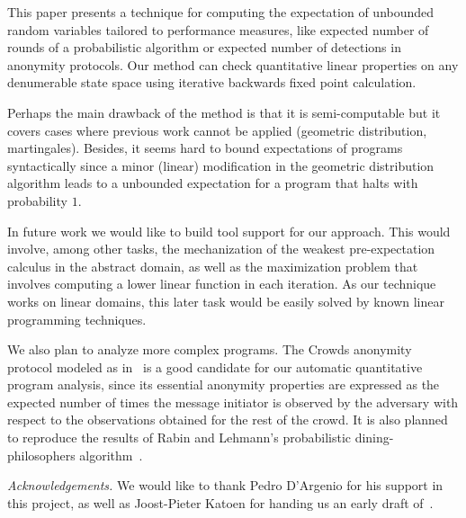 \documentclass{eptcs}
\theoremstyle{plain}
\theoremstyle{definition}
\begin{document}
\iffalse
The problem of automatic verification of quantitative properties has been a
subject of investigation over the last decades. Research in this area include
model checking
techniques~\cite{vardi85auto,hansson94pctl,bianco95mcp,hinton06prism,hermannsWZ08cegar},
theorem proving~\cite{hurd05mech,celiku06mech} and recently, automatic
quantitative invariant generation~\cite{katoen09linear}. To the author's
knowledge, neither of them can tackle this problem over unbounded quantitative
properties.
\fi


This paper presents a technique for computing the expectation of unbounded random
variables tailored to performance measures, like expected number of rounds of a
probabilistic algorithm or expected number of detections in anonymity protocols.
Our method can check quantitative linear properties on any denumerable state space using
iterative backwards fixed point calculation.



Perhaps the main drawback of the method is that it is semi-computable but it covers cases
where previous work cannot be applied (geometric distribution,
martingales). Besides, it seems hard to bound expectations of programs syntactically since a
minor (linear) modification in the geometric distribution algorithm leads to a
unbounded expectation for a program that halts with probability $1$.

\bigskip

In future work we would like to build tool support for our approach. This would
involve, among other tasks, the mechanization of the weakest pre-expectation
calculus in the abstract domain, as well as the maximization problem that involves computing a lower linear function in each iteration.
As our technique works on linear domains, this later task would be easily solved by known linear programming techniques.

We also plan to analyze more complex programs.
The Crowds anonymity protocol modeled as in~\cite{shmatikov04crowds} is a good candidate for our automatic quantitative program analysis, since its essential anonymity properties are expressed as the expected number of times the message initiator is observed by the adversary with respect to the observations obtained for the rest of the crowd.
It is also planned to reproduce the results of Rabin and Lehmann's probabilistic dining-philosophers algorithm~\cite{mciver02expected}.



\smallskip

\textit{Acknowledgements.} We would like to thank Pedro D'Argenio for his support in this project, as well as Joost-Pieter Katoen for handing us an early draft of~\cite{katoen09linear}.





\end{document}

